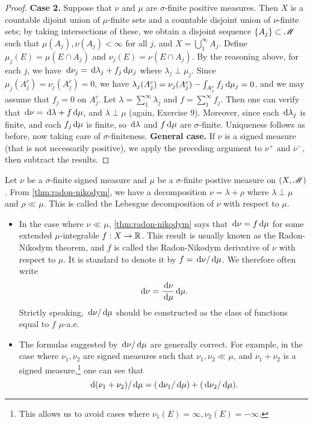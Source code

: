 \documentclass[12pt]{article} %
\begin{document}
\begin{proof}
    \textbf{Case 2.} Suppose that $\nu$ and $\mu$ are $\sigma$-finite positive measures. Then $X$ is a countable dijoint union of $\mu$-finite sets and a countable disjoint union of $\nu$-finite sets; by taking intersections of these, we obtain a disjoint sequence $\{A_j\} \subset \mathscr{M}$ such that $\mu(A_j), \nu(A_j) < \infty$ for all $j$, and $X = \bigcup_1^\infty A_j$. Define $\mu_j(E) = \mu(E \cap A_j)$ and $\nu_j(E) = \nu(E \cap A_j)$. By the reasoning above, for each $j$, we have $\, \mathrm{d}\nu_j = \, \mathrm{d}\lambda_j + f_j\, \mathrm{d}\mu_j$ where $\lambda_j \perp \mu_j$. Since $\mu_j(A_j^c) = \nu_j(A_j^c) = 0$, we have $\lambda_j(A_j^c) = \nu_j(A_j^c) - \int_{A_j^c}f_j \, \mathrm{d} \mu_j = 0$, and we may assume that $f_j = 0$ on $A_j^c$. Let $\lambda = \sum_1^\infty \lambda_j$ and $f = \sum_1^\infty f_j$. Then one can verify that $\, \mathrm{d} \nu = \, \mathrm{d}\lambda + f \, \mathrm{d}\mu$, and $\lambda \perp \mu$ (again, Exercise 9). Moreover, since each $\, \mathrm{d} \lambda_j$ is finite, and each $f_j \, \mathrm{d} \mu$ is finite, so $\, \mathrm{d}\lambda$ and $f \, \mathrm{d} \mu$ are $\sigma$-finite. Uniqueness follows as before, now taking care of $\sigma$-finiteness. \textbf{General case.} If $\nu$ is a signed measure (that is not necessarily positive), we apply the preceding argument to $\nu^+$ and $\nu^-$, then subtract the results.
\end{proof}

\begin{definition}
    Let $\nu$ be a $\sigma$-finite signed measure and $\mu$ be a $\sigma$-finite postive measure on $(X, \mathscr{M})$. From \cref{thm:radon-nikodym}, we have a decomposition $\nu = \lambda + \rho$ where $\lambda \perp \mu$ and $\rho \ll \mu$. This is called the Lebesgue decomposition of $\nu$ with respect to $\mu$.
\end{definition}

\begin{remark}
    \begin{itemize}
        \item In the case where $\nu \ll \mu$, \cref{thm:radon-nikodym} says that $\, \mathrm{d} \nu = f \, \mathrm{d} \mu$ for some extended $\mu$-integrable $f : X \to \mathbb{R}$. This result is usually known as the Radon-Nikodym theorem, and $f$ is called the Radon-Nikodym derivative of $\nu$ with respect to $\mu$. It is standard to denote it by $f = \, \mathrm{d}\nu / \, \mathrm{d}\mu$. We therefore often write \[\, \mathrm{d} \nu = \frac{\, \mathrm{d}\nu}{\, \mathrm{d}\mu}{\, \mathrm{d} \mu}.\] Strictly speaking, $\, \mathrm{d}\nu / \, \mathrm{d}\mu$ should be constructed as the class of functions equal to $f$ $\mu$-a.e.
        \item The formulas suggested by $\, \mathrm{d}\nu/\, \mathrm{d}\mu$ are generally correct. For example, in the case where $\nu_1, \nu_2$ are signed measures such that $\nu_1, \nu_2 \ll \mu$, and $\nu_1 + \nu_2$ is a signed measure,\footnote{This allows us to avoid cases where $\nu_1(E) = \infty, \nu_2(E) = - \infty$.} one can see that \[\, \mathrm{d}(\nu_1 + \nu_2) / \, \mathrm{d} \mu = (\, \mathrm{d}\nu_1/\, \mathrm{d}\mu) + (\, \mathrm{d}\nu_2/\, \mathrm{d}\mu).\]
    \end{itemize}
\end{remark}
\end{document}
